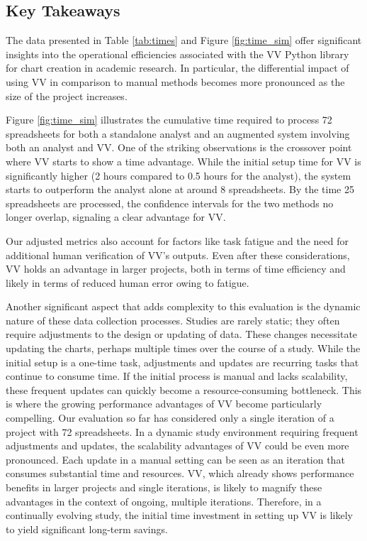 \subsection{Key Takeaways}\label{key-takeaways}

The data presented in Table \ref{tab:times} and Figure \ref{fig:time_sim} offer significant insights
into the operational efficiencies associated with the VV Python library
for chart creation in academic research. In particular, the differential
impact of using VV in comparison to manual methods becomes more
pronounced as the size of the project increases.

Figure \ref{fig:time_sim} illustrates the cumulative time required to process 72
spreadsheets for both a standalone analyst and an augmented system
involving both an analyst and VV. One of the striking observations is
the crossover point where VV starts to show a time advantage. While the
initial setup time for VV is significantly higher (2 hours compared to
0.5 hours for the analyst), the system starts to outperform the analyst
alone at around 8 spreadsheets. By the time 25 spreadsheets are
processed, the confidence intervals for the two methods no longer
overlap, signaling a clear advantage for VV.

Our adjusted metrics also account for factors like task fatigue and the
need for additional human verification of VV's outputs. Even after these
considerations, VV holds an advantage in larger projects, both in terms
of time efficiency and likely in terms of reduced human error owing to
fatigue.

Another significant aspect that adds complexity to this evaluation is
the dynamic nature of these data collection processes. Studies are
rarely static; they often require adjustments to the design or updating
of data. These changes necessitate updating the charts, perhaps multiple
times over the course of a study. While the initial setup is a one-time
task, adjustments and updates are recurring tasks that continue to
consume time. If the initial process is manual and lacks scalability,
these frequent updates can quickly become a resource-consuming
bottleneck. This is where the growing performance advantages of VV become particularly compelling. Our evaluation so far has
considered only a single iteration of a project with 72 spreadsheets. In
a dynamic study environment requiring frequent adjustments and updates,
the scalability advantages of VV could be even more pronounced. Each
update in a manual setting can be seen as an iteration that consumes
substantial time and resources. VV, which already shows performance
benefits in larger projects and single iterations, is likely to magnify
these advantages in the context of ongoing, multiple iterations.
Therefore, in a continually evolving study, the initial time investment
in setting up VV is likely to yield significant long-term savings.
